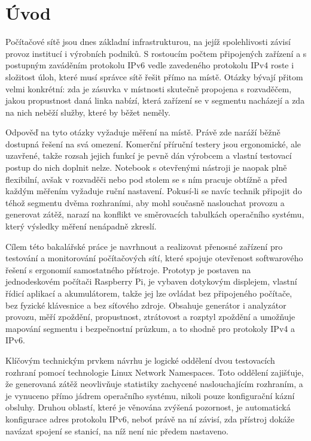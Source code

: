 \chapter{Úvod}
\label{sec:introduction}

Počítačové sítě jsou dnes základní infrastrukturou, na jejíž spolehlivosti závisí provoz institucí i výrobních podniků. S rostoucím počtem připojených zařízení a s postupným zaváděním protokolu IPv6 vedle zavedeného protokolu IPv4 roste i složitost úloh, které musí správce sítě řešit přímo na místě. Otázky bývají přitom velmi konkrétní: zda je zásuvka v místnosti skutečně propojena s rozvaděčem, jakou propustnost daná linka nabízí, která zařízení se v segmentu nacházejí a zda na nich neběží služby, které by běžet neměly.

Odpověď na tyto otázky vyžaduje měření na místě. Právě zde naráží běžně dostupná řešení na svá omezení. Komerční příruční testery jsou ergonomické, ale uzavřené, takže rozsah jejich funkcí je pevně dán výrobcem a vlastní testovací postup do nich doplnit nelze. Notebook s otevřenými nástroji je naopak plně flexibilní, avšak v rozvaděči nebo pod stolem se s ním pracuje obtížně a před každým měřením vyžaduje ruční nastavení. Pokusí-li se navíc technik připojit do téhož segmentu dvěma rozhraními, aby mohl současně naslouchat provozu a generovat zátěž, narazí na konflikt ve směrovacích tabulkách operačního systému, který výsledky měření nenápadně zkreslí.

Cílem této bakalářské práce je navrhnout a realizovat přenosné zařízení pro testování a monitorování počítačových sítí, které spojuje otevřenost softwarového řešení s ergonomií samostatného přístroje. Prototyp je postaven na jednodeskovém počítači Raspberry Pi, je vybaven dotykovým displejem, vlastní řídicí aplikací a akumulátorem, takže jej lze ovládat bez připojeného počítače, bez fyzické klávesnice a bez síťového zdroje. Obsahuje generátor i analyzátor provozu, měří zpoždění, propustnost, ztrátovost a rozptyl zpoždění a umožňuje mapování segmentu i bezpečnostní průzkum, a to shodně pro protokoly IPv4 a IPv6.

Klíčovým technickým prvkem návrhu je logické oddělení dvou testovacích rozhraní pomocí technologie Linux Network Namespaces. Toto oddělení zajišťuje, že generovaná zátěž neovlivňuje statistiky zachycené naslouchajícím rozhraním, a je vynuceno přímo jádrem operačního systému, nikoli pouze konfigurační kázní obsluhy. Druhou oblastí, které je věnována zvýšená pozornost, je automatická konfigurace adres protokolu IPv6, neboť právě na ní závisí, zda přístroj dokáže navázat spojení se stanicí, na níž není nic předem nastaveno.

